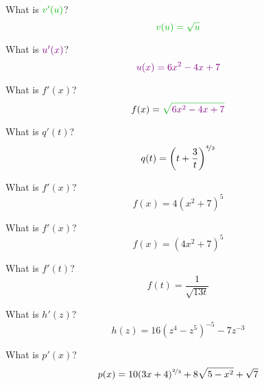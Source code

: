 
\begin{ProblemSet}[pencil space=2in]

 \begin{Problem}[pencil space=1in]
  What is $\OuterStyle{v'(u)}$?
  \begin{equation*}
   \OuterStyle{v(u) = \sqrt{u}}
  \end{equation*}
 \end{Problem}

 \begin{Problem}[pencil space=1in]
  What is $\InnerStyle{u'(x)}$?
  \begin{equation*}
   \InnerStyle{u(x) = 6 x^2 - 4x + 7}
  \end{equation*}
 \end{Problem}

 \begin{Problem}[pencil space=3in]
  What is $f'(x)$?
  \begin{equation*}
   f(x) = \OuterStyle{\sqrt{\InnerStyle{6 x^2 - 4x + 7}}}
  \end{equation*}
 \end{Problem}

 \begin{Problem}
  What is $q'(t)$?
  \begin{equation*}
   q(t) = \left(t + \frac{3}{t}\right)^{\nicefrac{4}{3}}
  \end{equation*}
 \end{Problem}

 \begin{Problem}
  What is $f'(x)$?
  \begin{equation*}
   f(x) = 4 (x^2 + 7)^5
  \end{equation*}
 \end{Problem}

 \begin{Problem}
  What is $f'(x)$?
  \begin{equation*}
   f(x) = (4 x^2 + 7)^5
  \end{equation*}
 \end{Problem}

 \begin{Problem}
  What is $f'(t)$?
  \begin{equation*}
   f(t) = \frac{1}{\sqrt{13 t}}
  \end{equation*}
 \end{Problem}

 \begin{Problem}
  What is $h'(z)$?
  \begin{equation*}
   h(z) = 16 \left(z^4 - z^5\right)^{-5} - 7 z^{-3}
  \end{equation*}
 \end{Problem}

 \begin{Problem}
  What is $p'(x)$?
  \begin{equation*}
   p(x) = 10 (3 x + 4)^{\nicefrac{2}{3}} + 8 \sqrt{5 - x^2} + \sqrt{7}
  \end{equation*}
 \end{Problem}

\end{ProblemSet}

